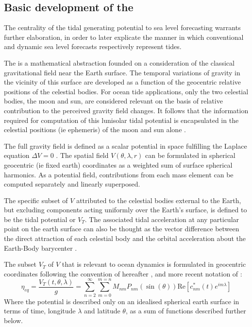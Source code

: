 \subsection{Basic development of the \ATGP{}}  \label{sec:basic_potential}
The centrality of the tidal generating potential to sea level forecasting warrants further elaboration, in order to later explicate the manner in which conventional and dynamic sea level forecasts respectively represent tides. 

The \ATGP{} is a mathematical abstraction founded on a consideration of the classical gravitational field near the Earth surface. The temporal variations of gravity in the vicinity of this surface are developed as a function of the geocentric relative positions of the celestial bodies.
For ocean tide applications, only the two celestial bodies, the moon and sun, are considered relevant on the basis of relative contribution to the perceived gravity field changes. It follows that the information required for computation of this lunisolar tidal potential is encapsulated in the celestial positions (ie ephemeris) of the moon and sun alone \citep{agnew2015}.


The full gravity field is defined as a scalar potential in space fulfilling the Laplace equation $\Delta V=0$ \citep[sec 5.3.1]{Urban:2013vl}.  The spatial field $V(\theta,\lambda,r)$ can be formulated in spherical geocentric (ie fixed earth) coordinates as a weighted sum of surface spherical harmonics. As a potential field, contributions from each mass element can be computed separately and linearly superposed.

The specific subset of $V$ attributed to the celestial bodies external to the Earth, but excluding components acting uniformly over the Earth's surface, is defined to be the tidal potential \ATGP{} or $V_T$.
The associated tidal acceleration at any particular point on the earth surface can also be thought as the vector difference between the direct attraction of each celestial body and the orbital acceleration about the Earth-Body barycenter \citep{Wenzel:1997kn}.


The subset $V_T$ of $V$ that is relevant to ocean dynamics is formulated in geocentric coordinates following the convention of \citet{Cartwright:1973em} hereafter \CTE{}, and more recent notation of \citet{Desai:2006wo}:
\begin{equation}
    \eta_{eq} = \frac{V_T(t,\theta,\lambda) }{g} = \sum_{n=2}^{\infty} \sum_{m=0}^{m=n} M_{nm} P_{nm}( \sin(\theta) ) \text{Re} \left [ c^{*}_{nm}(t) e^{im\lambda} \right ]
    \label{eq:VT}
\end{equation}
Where the potential is described only on an idealised spherical earth surface in terms of time, longitude $\lambda$ and latitude $\theta$, as a sum of functions described further below. 

